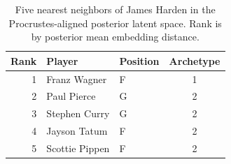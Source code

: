 \begin{table}[htbp]
  \centering\small
  \begin{tabular}{rllc}
    \toprule
    Rank & Player & Position & Archetype \\
    \midrule
    1 & Franz Wagner & F & 1 \\
    2 & Paul Pierce & G & 2 \\
    3 & Stephen Curry & G & 2 \\
    4 & Jayson Tatum & F & 2 \\
    5 & Scottie Pippen & F & 2 \\
    \bottomrule
  \end{tabular}
  \caption{Five nearest neighbors of James Harden in the Procrustes-aligned posterior latent space. Rank is by posterior mean embedding distance.}
  \label{tab:James_Harden_neighbors}
\end{table}

